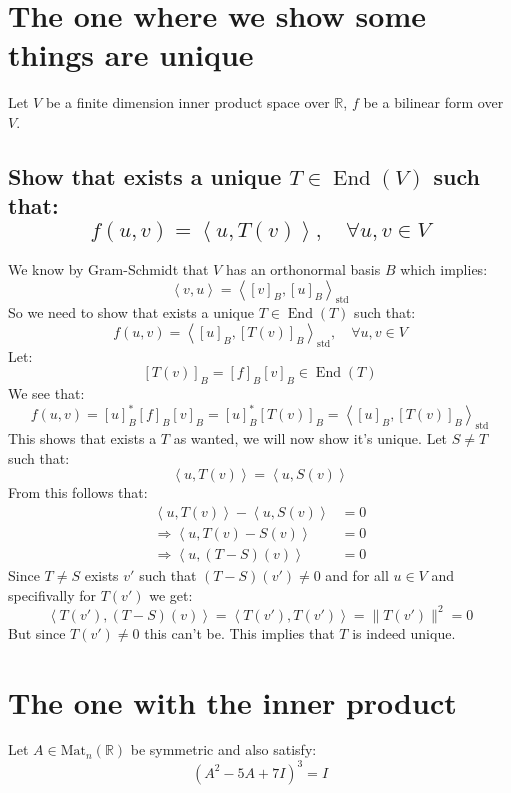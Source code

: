 \documentclass[11pt,a4paper]{article}
\theoremstyle{plain}
\DeclareMathOperator{\End}{End}
\DeclareMathOperator{\std}{std}
\newcommand{\R}{\mathbb{R}}
\newcommand{\ip}[2]{\left\langle #1, #2 \right\rangle}
\begin{document}
	
	
	
	\newpage
	
	\section{The one where we show some things are unique}
	Let $V$ be a finite dimension inner product space over $\R$, $f$ be a 
	bilinear form over $V$.
	\subsection{Show that exists a unique $T\in\End(V)$ such that:
	\[
		f(u,v) = \ip{u}{T(v)}, \quad \forall u,v\in V
	\]}
	We know by Gram-Schmidt that $V$ has an orthonormal basis $B$ which 
	implies:
	\[
		\ip{v}{u} = \ip{[v]_B}{[u]_B}_{\std}
	\]
	So we need to show that exists a unique $T\in\End(T)$ such that:
	\[
		f(u,v) = \ip{[u]_B}{[T(v)]_B}_{\std}, \quad \forall u,v\in V
	\]
	Let:
	\[
		[T(v)]_B = [f]_B [v]_B \in \End(T)
	\]
	We see that:
	\[
		f(u,v) = [u]_B^* [f]_B [v]_B = [u]_B^* [T(v)]_B
		= \ip{[u]_B}{[T(v)]_B}_{\std}
	\]
	This shows that exists a $T$ as wanted, we will now show it's unique.
	Let $S\neq T$ such that:
	\[
		\ip{u}{T(v)} = \ip{u}{S(v)}
	\]
	From this follows that:
	\begin{align*}
		\ip{u}{T(v)} - \ip{u}{S(v)} &= 0 \\ \Rightarrow
		\ip{u}{T(v)-S(v)} &= 0 \\ \Rightarrow
		\ip{u}{(T-S)(v)} &= 0
	\end{align*}
	Since $T \neq S$ exists $v'$ such that $(T-S)(v')\neq 0$ and for all 
	$u\in V$ and specifivally for $T(v')$ we get:
	\[
		\ip{T(v')}{(T-S)(v)} = \ip{T(v')}{T(v')} = \|T(v')\|^2 = 0
	\]
	But since $T(v') \neq 0$ this can't be. This implies that $T$ is indeed
	unique.
	
	\newpage
	\section{The one with the inner product}
	Let $A\in \mathrm{Mat}_n(\R)$ be symmetric and also satisfy:
	\[
		(A^2-5A+7I)^3 = I
	\]
\end{document}
